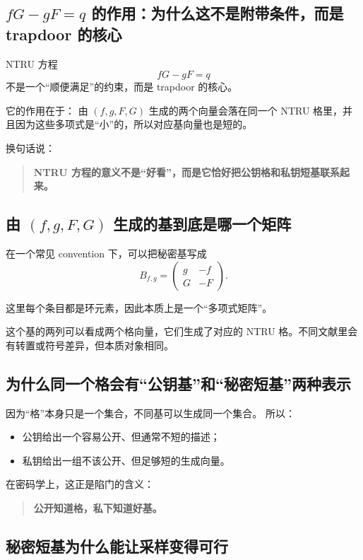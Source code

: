 \documentclass[11pt,a4paper]{ctexart}
\begin{document}
\subsection{\(fG-gF=q\) 的作用：为什么这不是附带条件，而是 trapdoor 的核心}

NTRU 方程
\[
fG-gF=q
\]
不是一个“顺便满足”的约束，而是 trapdoor 的核心。

它的作用在于：  
由 \((f,g,F,G)\) 生成的两个向量会落在同一个 NTRU 格里，并且因为这些多项式是“小”的，所以对应基向量也是短的。

换句话说：

\begin{quote}
\textbf{NTRU 方程的意义不是“好看”，而是它恰好把公钥格和私钥短基联系起来。}
\end{quote}

\subsection{由 \((f,g,F,G)\) 生成的基到底是哪一个矩阵}

在一个常见 convention 下，可以把秘密基写成
\[
B_{f,g}=
\begin{pmatrix}
g & -f\\
G & -F
\end{pmatrix}.
\]

这里每个条目都是环元素，因此本质上是一个“多项式矩阵”。

这个基的两列可以看成两个格向量，它们生成了对应的 NTRU 格。不同文献里会有转置或符号差异，但本质对象相同。

\subsection{为什么同一个格会有“公钥基”和“秘密短基”两种表示}

因为“格”本身只是一个集合，不同基可以生成同一个集合。  
所以：

\begin{itemize}
    \item 公钥给出一个容易公开、但通常不短的描述；
    \item 私钥给出一组不该公开、但足够短的生成向量。
\end{itemize}

在密码学上，这正是陷门的含义：

\begin{quote}
\textbf{公开知道格，私下知道好基。}
\end{quote}

\subsection{秘密短基为什么能让采样变得可行}
\end{document}
